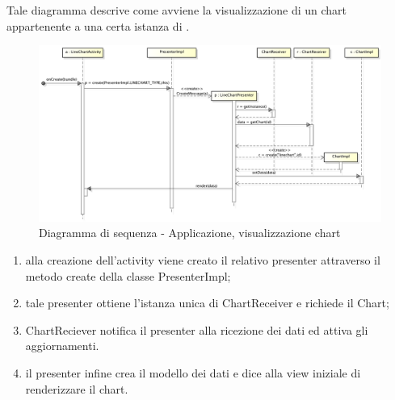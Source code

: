 \begin{itemize}
            Tale diagramma descrive come avviene la visualizzazione di un chart appartenente a una certa istanza di .
            \begin{figure}[H]
                \centering
                \includegraphics[scale=0.3]{DefinizioneDiProdotto/Pics/ApplicazioneVisualizzazioneChart}
                \caption{Diagramma di sequenza - Applicazione, visualizzazione chart}
            \end{figure}
            \begin{enumerate}
                \item alla creazione dell'activity viene creato il relativo presenter attraverso il metodo create della classe PresenterImpl;
                \item tale presenter ottiene l'istanza unica di ChartReceiver e richiede il Chart;
                \item ChartReciever notifica il presenter alla ricezione dei dati ed attiva gli aggiornamenti.
                \item il presenter infine crea il modello dei dati e dice alla view iniziale di renderizzare il chart.
            \end{enumerate}
            

\end{itemize}
